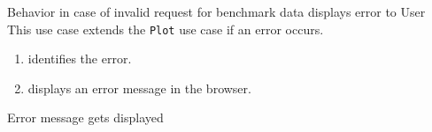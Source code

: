 \bigskip

{Behavior in case of invalid request for benchmark data}
{displays error to User}
{This use case extends the \texttt{Plot} use case if an error occurs.}
{\begin{enumerate}
    \item \parkview{} identifies the error.
    \item \parkview{} displays an error message in the browser.
\end{enumerate}}
{Error message gets displayed}

